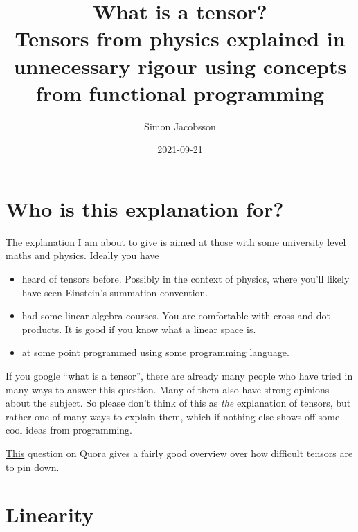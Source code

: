 \documentclass[english, 12pt]{article}
\title{What is a tensor?\\Tensors from physics explained in unnecessary rigour using concepts from functional programming\\\ding{166}}
\author{Simon Jacobsson}
\date{2021-09-21}
\begin{document}
 
\maketitle


\section{Who is this explanation for?}%
\label{sec:who_is_this_explanation_for_}

The explanation I am about to give is aimed at those with some university level maths and physics.
Ideally you have
\begin{itemize}
	\item heard of tensors before.
	Possibly in the context of physics, where you'll likely have seen Einstein's summation convention.
	\item had some linear algebra courses.
	You are comfortable with cross and dot products.
	It is good if you know what a linear space is.
	\item at some point programmed using some programming language.
\end{itemize}

If you google \enquote{what is a tensor}, there are already many people who have tried in many ways to answer this question.
Many of them also have strong opinions about the subject.
So please don't think of this as \emph{the} explanation of tensors, but rather one of many ways to explain them, which if nothing else shows off some cool ideas from programming.

\href{https://www.quora.com/Why-is-it-difficult-to-explain-tensors?}{\color{blue}This} question on Quora gives a fairly good overview over how difficult tensors are to pin down.

\section{Linearity}%
\label{sec:linearity}
\end{document}
